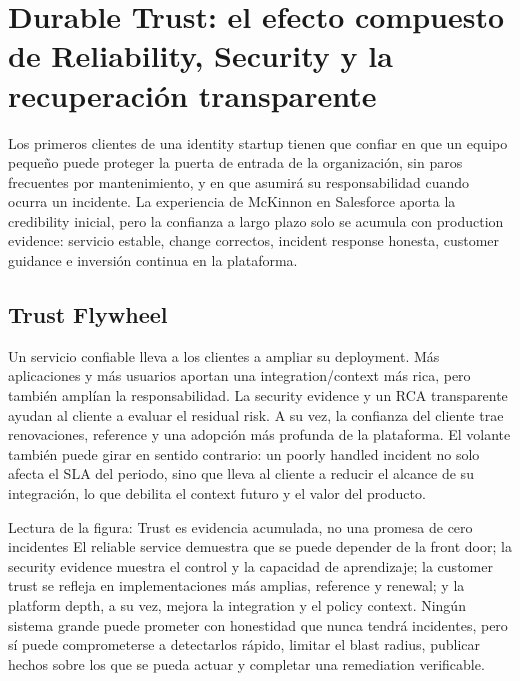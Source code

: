 \section{Durable Trust: el efecto compuesto de Reliability, Security y la recuperación transparente}

Los primeros clientes de una identity startup tienen que confiar en que un equipo pequeño puede proteger la puerta de entrada de la organización, sin paros frecuentes por mantenimiento, y en que asumirá su responsabilidad cuando ocurra un incidente. La experiencia de McKinnon en Salesforce aporta la credibility inicial, pero la confianza a largo plazo solo se acumula con production evidence: servicio estable, change correctos, incident response honesta, customer guidance e inversión continua en la plataforma.

\subsection{Trust Flywheel}

Un servicio confiable lleva a los clientes a ampliar su deployment. Más aplicaciones y más usuarios aportan una integration/context más rica, pero también amplían la responsabilidad. La security evidence y un RCA transparente ayudan al cliente a evaluar el residual risk. A su vez, la confianza del cliente trae renovaciones, reference y una adopción más profunda de la plataforma. El volante también puede girar en sentido contrario: un poorly handled incident no solo afecta el SLA del periodo, sino que lleva al cliente a reducir el alcance de su integración, lo que debilita el context futuro y el valor del producto.


\begin{knowledgebox}{Lectura de la figura: Trust es evidencia acumulada, no una promesa de cero incidentes}
El reliable service demuestra que se puede depender de la front door; la security evidence muestra el control y la capacidad de aprendizaje; la customer trust se refleja en implementaciones más amplias, reference y renewal; y la platform depth, a su vez, mejora la integration y el policy context. Ningún sistema grande puede prometer con honestidad que nunca tendrá incidentes, pero sí puede comprometerse a detectarlos rápido, limitar el blast radius, publicar hechos sobre los que se pueda actuar y completar una remediation verificable.
\end{knowledgebox}

